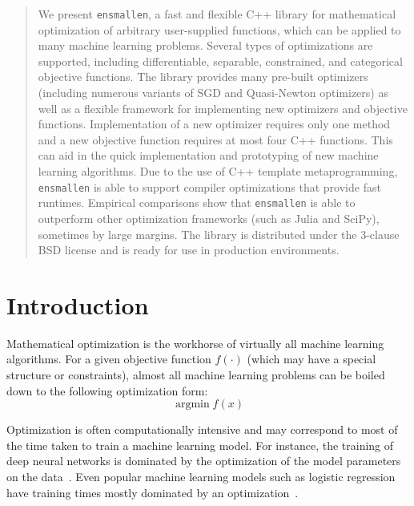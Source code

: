 \documentclass{article}
\begin{document}
\begin{abstract}
\vspace*{-0.3em}
We present {\tt ensmallen}, a fast and flexible C++ library for mathematical optimization of 
arbitrary user-supplied functions,
which can be applied to many machine learning problems.
Several types of optimizations are supported, including differentiable,
separable, constrained, and categorical objective functions.
The library provides many pre-built optimizers
(including numerous variants of SGD and Quasi-Newton optimizers)
as well as a flexible framework for implementing new optimizers and objective functions.
Implementation of a new optimizer requires only one method
and a new objective function requires at most four C++ functions. 
This can aid in the quick implementation and prototyping of new machine learning algorithms.
Due to the use of C++ template metaprogramming, {\tt ensmallen} is able to
support compiler optimizations that provide fast runtimes.
Empirical comparisons show that {\tt ensmallen} is able to outperform other
optimization frameworks (such as Julia and SciPy), sometimes by large margins.
The library is distributed under the 3-clause BSD license and is ready for use
in production environments.
\end{abstract}

\section{Introduction}

Mathematical optimization is the workhorse of virtually all machine learning
algorithms.  For a given objective function $f(\cdot)$
(which may have a special structure or constraints),
almost all machine learning problems can be boiled down
to the following optimization form:
%
\begin{equation}
\operatorname{argmin} f(x)
\end{equation}
\vspace*{-1.5em}

Optimization is often computationally intensive and may correspond
to most of the time taken to train a machine learning model.  For instance, the
training of deep neural networks is dominated by the optimization of the model
parameters on the data~\cite{schmidhuber2015deep}.
Even popular machine learning models such as logistic regression
have training times mostly dominated by an optimization~\cite{kingma2015adam}.
%
\end{document}
